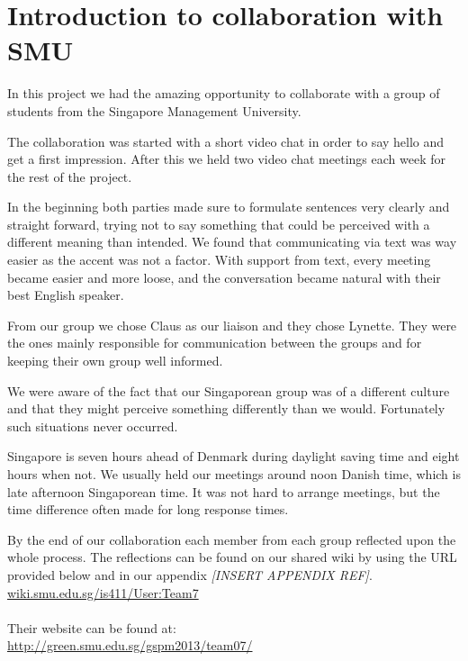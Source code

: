 \section{Introduction to collaboration with SMU}
In this project we had the amazing opportunity to collaborate with a group of students from the Singapore Management University.

The collaboration was started with a short video chat in order to say hello and get a first impression. After this we held two video chat meetings each week for the rest of the project.

In the beginning both parties made sure to formulate sentences very clearly and straight forward, trying not to say something that could be perceived with a different meaning than intended. We found that communicating via text was way easier as the accent was not a factor.
With support from text, every meeting became easier and more loose, and the conversation became natural with their best English speaker.

From our group we chose Claus as our liaison and they chose Lynette. They were the ones mainly responsible for communication between the groups and for keeping their own group well informed.

We were aware of the fact that our Singaporean group was of a different culture and that they might perceive something differently than we would. Fortunately such situations never occurred.

Singapore is seven hours ahead of Denmark during daylight saving time and eight hours when not. We usually held our meetings around noon Danish time, which is late afternoon Singaporean time. It was not hard to arrange meetings, but the time difference often made for long response times.

By the end of our collaboration each member from each group reflected upon the whole process. The reflections can be found on our shared wiki by using the URL provided below and in our appendix \textit{[INSERT APPENDIX REF]}.
\\\url{wiki.smu.edu.sg/is411/User:Team7}\\\\

Their website can be found at:
\\\url{http://green.smu.edu.sg/gspm2013/team07/}
\newpage